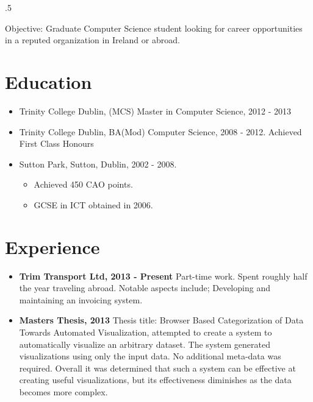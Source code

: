 \documentclass{res}
\begin{document}
 

\thispagestyle{empty} %
\pagestyle{empty}
\address{14 Strand Road\\
Sutton\\
Dublin 13\\
00 353 86 3807768\\
divines@tcd.ie}






\begin{resume}
\vspace{0.1in}
\moveleft.5\sectionwidth\centerline{Objective: Graduate Computer Science student looking for career opportunities in a reputed organization in Ireland or abroad.}  


\section{Education}
\vspace{0.1in} 

  \begin{itemize}
    \item Trinity College Dublin, (MCS) Master in Computer Science, 2012 - 2013
 
    \item Trinity College Dublin, BA(Mod) Computer Science, 2008 - 2012. Achieved First Class Honours
 
    \item Sutton Park, Sutton, Dublin, 2002 - 2008.
      \begin{itemize}
        \item Achieved 450 CAO points.
        \item GCSE in ICT obtained in 2006.
      \end{itemize}
  \end{itemize}
    

\section{Experience} 
\vspace{0.1in}
  \begin{itemize}
    \item{\bf{Trim Transport Ltd, 2013 - Present}} Part-time work. Spent roughly half the year traveling abroad. Notable aspects include; Developing and maintaining an invoicing system.\\

    \item{{\bf Masters Thesis, 2013}} Thesis title: Browser Based Categorization of Data Towards Automated Visualization, attempted to create a system to automatically visualize an arbitrary dataset. The system generated visualizations using only the input data. No additional meta-data was required. Overall it was determined that such a system can be effective at creating useful visualizations, but its effectiveness diminishes as the data becomes more complex.\\



\end{itemize}
\end{resume}
\end{document}
